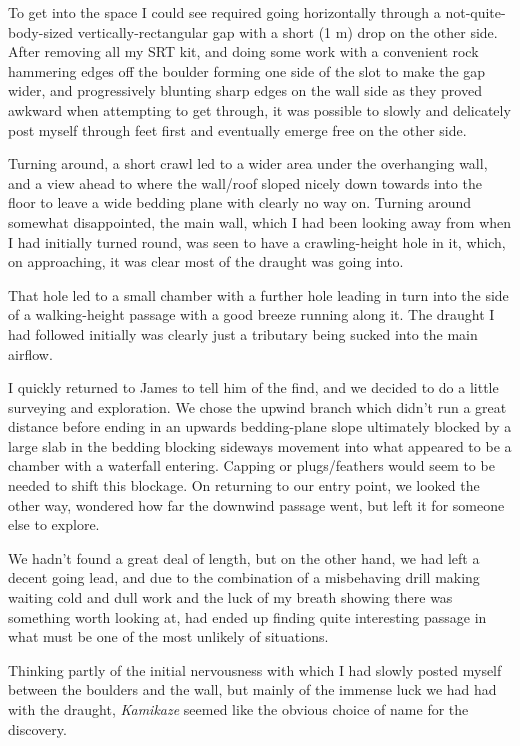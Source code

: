 To get into the space I could see required going horizontally through a
not-quite-body-sized vertically-rectangular gap with a short (1 m) drop
on the other side. After removing all my SRT kit, and doing some work
with a convenient rock hammering edges off the boulder forming one side
of the slot to make the gap wider, and progressively blunting sharp
edges on the wall side as they proved awkward when attempting to get
through, it was possible to slowly and delicately post myself through
feet first and eventually emerge free on the other side.

Turning around, a short crawl led to a wider area under the overhanging
wall, and a view ahead to where the wall/roof sloped nicely down towards
into the floor to leave a wide bedding plane with clearly no way on.
Turning around somewhat disappointed, the main wall, which I had been
looking away from when I had initially turned round, was seen to have a
crawling-height hole in it, which, on approaching, it was clear most of
the draught was going into.

That hole led to a small chamber with a further hole leading in turn
into the side of a walking-height passage with a good breeze running
along it. The draught I had followed initially was clearly just a
tributary being sucked into the main airflow.

I quickly returned to James to tell him of the find, and we decided to
do a little surveying and exploration. We chose the upwind branch which
didn't run a great distance before ending in an upwards bedding-plane
slope ultimately blocked by a large slab in the bedding blocking
sideways movement into what appeared to be a chamber with a waterfall
entering. Capping or plugs/feathers would seem to be needed to shift
this blockage. On returning to our entry point, we looked the other way,
wondered how far the downwind passage went, but left it for someone else
to explore.

We hadn't found a great deal of length, but on the other hand, we had
left a decent going lead, and due to the combination of a misbehaving
drill making waiting cold and dull work and the luck of my breath
showing there was something worth looking at, had ended up finding quite
interesting passage in what must be one of the most unlikely of
situations.

Thinking partly of the initial nervousness with which I had slowly
posted myself between the boulders and the wall, but mainly of the
immense luck we had had with the draught, \emph{Kamikaze} seemed like
the obvious choice of name for the discovery.

